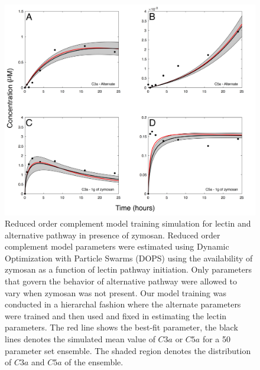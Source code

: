 \documentclass[12pt]{article}
\begin{document}
\begin{figure}[h]
\centering
\includegraphics[width=1.0\textwidth]{./figs/Figure2_Fit.pdf}
\caption{Reduced order complement model training simulation for lectin and alternative pathway in presence of zymosan. Reduced order complement model parameters were estimated using Dynamic Optimization with Particle Swarms (DOPS) using the availability of zymosan as a function of lectin pathway initiation.  Only parameters that govern the behavior of alternative pathway were allowed to vary when zymosan was not present. Our model training was conducted in a hierarchal fashion where the alternate parameters were trained and then used and fixed in estimating the lectin parameters. The red line shows the best-fit parameter, the black lines denotes the simulated mean value of $C3a$ or $C5a$ for a 50 parameter set ensemble. The shaded region denotes the distribution of $C3a$ and $C5a$ of the ensemble.}\label{fig-fit}
\end{figure}
\end{document}
